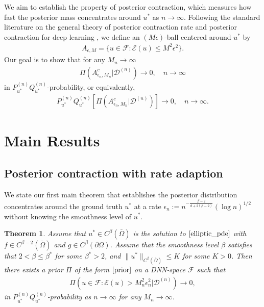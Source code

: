 \documentclass{article}
\newcommand{\F}{\mathcal{F}}
\newcommand{\D}{\mathcal{D}}
\theoremstyle{plain}
\newtheorem{theorem}{Theorem}[section]
\theoremstyle{definition}
\theoremstyle{remark}
\begin{document}
We aim to establish the property of posterior contraction, which measures how fast the posterior mass concentrates around $u^*$ as $n \to \infty$. Following the standard literature on the general theory of posterior contraction rate \citep[Chapter 8]{ghosal2017fundamentals} and posterior contraction for deep learning \citep[Section 5]{polson2018posterior}, we define an $(M\epsilon)$-ball centered around $u^*$ by 
\begin{align*}
    A_{\epsilon, M} = \{u \in \F: \mathcal{E}(u) \leq M^2 \epsilon^2\}.
\end{align*}
Our goal is to show that for any $M_n \to \infty$
\begin{align*}
    \Pi(A_{\epsilon_n, M_n}^c | \D^{(n)}) \to 0, \quad n \to \infty 
\end{align*}
in $P_{u^*}^{(n)} Q_{u^*}^{(n)}$-probability, or equivalently,
\begin{align*}
    P_{u^*}^{(n)} Q_{u^*}^{(n)} \left[ \Pi(A_{\epsilon_n, M_n}^c | \D^{(n)})\right] \to 0, \quad n \to \infty.
\end{align*}

\section{Main Results} \label{main_results}

\subsection{Posterior contraction with rate adaption}
We state our first main theorem that establishes the posterior distribution concentrates around the ground truth $u^*$  at a rate $\epsilon_n := n^{-\frac{\beta-2}{d + 2(\beta-2)}} (\log n)^{1/2}$ without knowing the smoothness level of $u^*$.

\begin{theorem}\label{upper_bound}
     Assume that $u^*  \in C^\beta(\bar{\Omega})$ is the solution to $\eqref{elliptic_pde}$ with $f \in C^{\beta-2}(\bar{\Omega})$ and $g \in C^\beta(\partial{\Omega})$.  Assume that the smoothness level $\beta$ satisfies that  $2 < \beta \leq \beta^\ast$ for some $\beta^\ast > 2$, and $\|u^*\|_{C^{\beta}(\bar{\Omega})} \leq K$ for some $K > 0$. Then there exists 
     a prior $\Pi$ of the form $\eqref{prior}$ on a DNN-space $\F$ such that
     \begin{align} \label{posteior_contraction}
         \Pi(u \in \F: \mathcal{E}(u) > M_n^2 \epsilon_n^2 | \D^{(n)}) \to 0,
     \end{align}
     in $P_{u^*}^{(n)} Q_{u^*}^{(n)}$-probability as $n \to \infty$ for any $M_n \to \infty$. 
\end{theorem}
\end{document}
